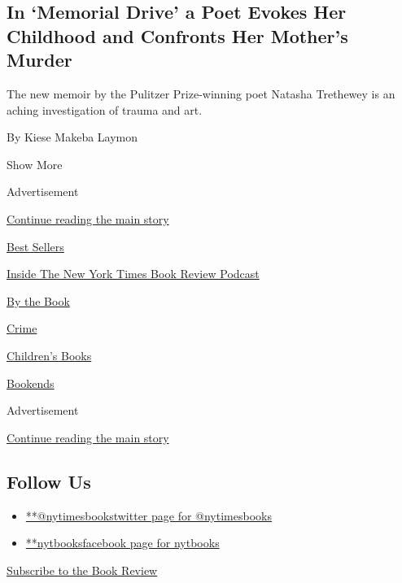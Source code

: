 \begin{enumerate}
  \hypertarget{in-memorial-drive-a-poet-evokes-her-childhood-and-confronts-her-mothers-murder}{%
  \subsection{In `Memorial Drive' a Poet Evokes Her Childhood and
  Confronts Her Mother's
  Murder}\label{in-memorial-drive-a-poet-evokes-her-childhood-and-confronts-her-mothers-murder}}

  The new memoir by the Pulitzer Prize-winning poet Natasha Trethewey is
  an aching investigation of trauma and art.

  By Kiese Makeba Laymon
\end{enumerate}

Show More

Advertisement

\protect\hyperlink{after-mid2}{Continue reading the main story}

\href{https://www.nytimes3xbfgragh.onion/best-sellers-books/overview.html}{Best
Sellers}

\href{https://www.nytimes3xbfgragh.onion/column/book-review-podcast}{Inside
The New York Times Book Review Podcast}

\href{https://www.nytimes3xbfgragh.onion/column/by-the-book}{By the
Book}

\href{https://www.nytimes3xbfgragh.onion/column/crime}{Crime}

\href{https://www.nytimes3xbfgragh.onion/column/childrens-books}{Children's
Books}

\href{https://www.nytimes3xbfgragh.onion/column/bookends}{Bookends}

Advertisement

\protect\hyperlink{after-mktg}{Continue reading the main story}

\hypertarget{follow-us}{%
\subsection{Follow Us}\label{follow-us}}

\begin{itemize}
\tightlist
\item
  \href{https://twitter.com/nytimesbooks}{**@nytimesbookstwitter page
  for @nytimesbooks}
\item
  \href{https://www.facebookcorewwwi.onion/nytbooks}{**nytbooksfacebook
  page for nytbooks}
\end{itemize}

\href{https://homedelivery.nytimes3xbfgragh.onion/HDS/BookReviewHome.do?mode=BookReviewHome\&ref=review}{Subscribe
to the Book Review}

